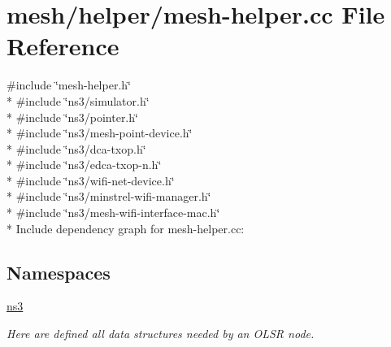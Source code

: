 \hypertarget{mesh-helper_8cc}{}\section{mesh/helper/mesh-\/helper.cc File Reference}
\label{mesh-helper_8cc}
{\ttfamily \#include \char`\"{}mesh-\/helper.\+h\char`\"{}}\\*
{\ttfamily \#include \char`\"{}ns3/simulator.\+h\char`\"{}}\\*
{\ttfamily \#include \char`\"{}ns3/pointer.\+h\char`\"{}}\\*
{\ttfamily \#include \char`\"{}ns3/mesh-\/point-\/device.\+h\char`\"{}}\\*
{\ttfamily \#include \char`\"{}ns3/dca-\/txop.\+h\char`\"{}}\\*
{\ttfamily \#include \char`\"{}ns3/edca-\/txop-\/n.\+h\char`\"{}}\\*
{\ttfamily \#include \char`\"{}ns3/wifi-\/net-\/device.\+h\char`\"{}}\\*
{\ttfamily \#include \char`\"{}ns3/minstrel-\/wifi-\/manager.\+h\char`\"{}}\\*
{\ttfamily \#include \char`\"{}ns3/mesh-\/wifi-\/interface-\/mac.\+h\char`\"{}}\\*
Include dependency graph for mesh-\/helper.cc\+:
\subsection*{Namespaces}
\begin{DoxyCompactItemize}
\item 
 \hyperlink{namespacens3}{ns3}
\begin{DoxyCompactList}\small\item\em Here are defined all data structures needed by an O\+L\+SR node. \end{DoxyCompactList}\end{DoxyCompactItemize}

